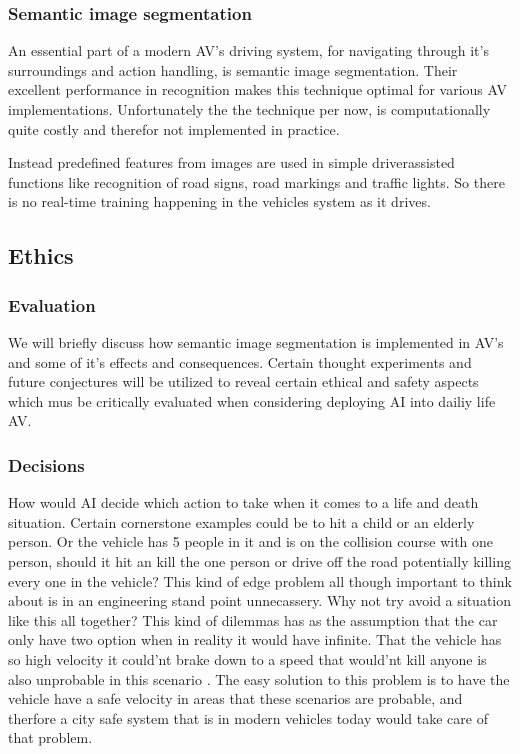 \documentclass[conference]{IEEEtran}
\begin{document}
	\subsubsection{Semantic image segmentation}
		An essential part of a modern AV's driving system, for navigating through it's surroundings 
		and action handling, is semantic image segmentation. Their excellent performance in recognition
		makes this technique optimal for various AV implementations\cite{CVPR}. Unfortunately the the technique per now,
		is computationally quite costly and therefor not implemented in practice.\cite{Bugala2018}

		Instead predefined features from images are used in simple driverassisted functions like 
		recognition of road signs, road markings and traffic lights. So there is no real-time training 
		happening in the vehicles system as it drives.

 \subsection{Ethics}
	\subsubsection{Evaluation}
		We will briefly discuss how semantic image segmentation is implemented
		in AV's and some of it's effects and consequences. Certain thought experiments and 
		future conjectures will be utilized to reveal certain ethical and safety aspects which
		mus be critically evaluated when considering deploying AI into dailiy life AV.

	\subsubsection{Decisions}
		How would AI decide which action to take when it comes to a life and death situation. Certain 
		cornerstone examples could be to hit a child or an elderly person. Or the vehicle has 5 people in it and is on the collision course
		with one person, should it hit an kill the one person or drive off the road potentially killing every one in the vehicle? 
		This kind of edge problem all though important to think about is in an engineering stand point unnecassery. Why not try avoid a situation 
		like this all together? This kind of dilemmas has as the assumption that the car only have two option when in reality it would have infinite.
		That the vehicle has so high velocity it could'nt brake down to a speed that would'nt kill anyone is also unprobable in this scenario \cite{IEEE:ethics}. 
		The easy solution to this problem is to have the vehicle have a safe velocity in areas that these scenarios are probable, and therfore a city safe system
		that is in modern vehicles today would take care of that problem.
\end{document}

